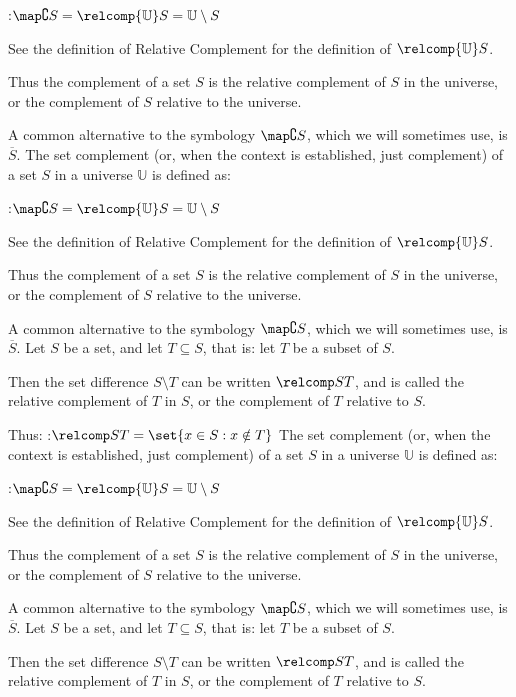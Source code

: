 :$\map \complement S = \relcomp {\mathbb U} S = \mathbb U \setminus S$

See the definition of Relative Complement for the definition of $\relcomp {\mathbb U} S$.


Thus the complement of a set $S$ is the relative complement of $S$ in the universe, or the complement of $S$ relative to the universe.

A common alternative to the symbology $\map \complement S$, which we will sometimes use, is $\overline S$.
The set complement (or, when the context is established, just complement) of a set $S$ in a universe $\mathbb U$ is defined as:

:$\map \complement S = \relcomp {\mathbb U} S = \mathbb U \setminus S$

See the definition of Relative Complement for the definition of $\relcomp {\mathbb U} S$.


Thus the complement of a set $S$ is the relative complement of $S$ in the universe, or the complement of $S$ relative to the universe.

A common alternative to the symbology $\map \complement S$, which we will sometimes use, is $\overline S$.
Let $S$ be a set, and let $T \subseteq S$, that is: let $T$ be a subset of $S$.

Then the set difference $S \setminus T$ can be written $\relcomp S T$, and is called the relative complement of $T$ in $S$, or the complement of $T$ relative to $S$.

Thus:
:$\relcomp S T = \set {x \in S : x \notin T}$
The set complement (or, when the context is established, just complement) of a set $S$ in a universe $\mathbb U$ is defined as:

:$\map \complement S = \relcomp {\mathbb U} S = \mathbb U \setminus S$

See the definition of Relative Complement for the definition of $\relcomp {\mathbb U} S$.


Thus the complement of a set $S$ is the relative complement of $S$ in the universe, or the complement of $S$ relative to the universe.

A common alternative to the symbology $\map \complement S$, which we will sometimes use, is $\overline S$.
Let $S$ be a set, and let $T \subseteq S$, that is: let $T$ be a subset of $S$.

Then the set difference $S \setminus T$ can be written $\relcomp S T$, and is called the relative complement of $T$ in $S$, or the complement of $T$ relative to $S$.

